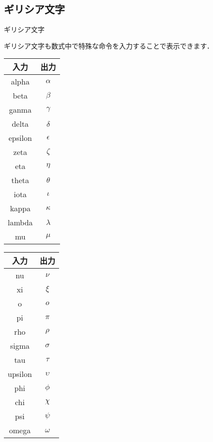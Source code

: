 \documentclass[slide,dvipdfmx]{beamer}
\newcommand{\bs}{\texttt{\symbol{"5C}}}
\begin{document}
\subsection{ギリシア文字}
\begin{frame}{ギリシア文字}

ギリシア文字も数式中で特殊な命令を入力することで表示できます．

\begin{multicols}{2}

\begin{tabular}{|c|c|} \hline
入力 & 出力 \\ \hline
\bs alpha & $\alpha$ \\ \hline
\bs beta & $\beta$ \\ \hline
\bs ganma & $\gamma$ \\ \hline
\bs delta & $\delta$ \\ \hline
\bs epsilon & $\epsilon$ \\ \hline
\bs zeta & $\zeta$ \\ \hline
\bs eta& $\eta$ \\ \hline


\bs theta & $\theta$ \\ \hline
\bs iota & $\iota$ \\ \hline
\bs kappa & $\kappa$ \\ \hline
\bs lambda & $\lambda$ \\ \hline
\bs mu & $\mu$ \\ \hline
\end{tabular}

\begin{tabular}{|c|c|} \hline
入力 & 出力 \\ \hline
\bs nu & $\nu$ \\ \hline
\bs xi & $\xi$ \\ \hline
o & $o$ \\ \hline
\bs pi & $\pi$ \\ \hline
\bs rho & $\rho$ \\ \hline
\bs sigma& $\sigma$ \\ \hline
\bs tau & $\tau$ \\ \hline
\bs upsilon& $\upsilon$ \\ \hline
\bs phi & $\phi$ \\ \hline
\bs chi & $\chi$ \\ \hline
\bs psi & $\psi$ \\ \hline
\bs omega & $\omega$ \\ \hline
\end{tabular}

\end{multicols}

\end{frame}
\end{document}

